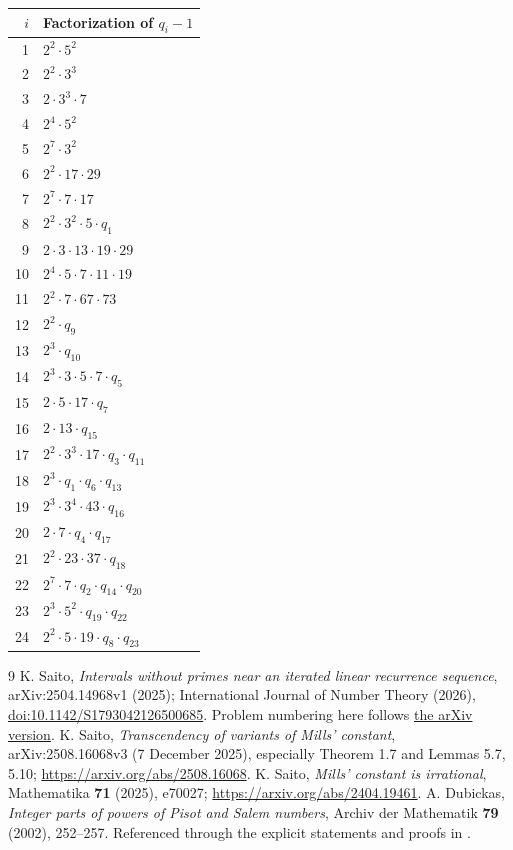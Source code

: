 \documentclass[11pt,a4paper]{article}
\theoremstyle{definition}\newtheorem{definition}[theorem]{Definition}
\theoremstyle{remark}\newtheorem{remark}[theorem]{Remark}
\begin{document}
\begin{longtable}{r p{.77\linewidth}}
\toprule $i$ & Factorization of $q_i-1$\\\midrule\endhead
1 & $2^{2}\cdot 5^{2}$\\
2 & $2^{2}\cdot 3^{3}$\\
3 & $2\cdot 3^{3}\cdot 7$\\
4 & $2^{4}\cdot 5^{2}$\\
5 & $2^{7}\cdot 3^{2}$\\
6 & $2^{2}\cdot 17\cdot 29$\\
7 & $2^{7}\cdot 7\cdot 17$\\
8 & $2^{2}\cdot 3^{2}\cdot 5\cdot q_{1}$\\
9 & $2\cdot 3\cdot 13\cdot 19\cdot 29$\\
10 & $2^{4}\cdot 5\cdot 7\cdot 11\cdot 19$\\
11 & $2^{2}\cdot 7\cdot 67\cdot 73$\\
12 & $2^{2}\cdot q_{9}$\\
13 & $2^{3}\cdot q_{10}$\\
14 & $2^{3}\cdot 3\cdot 5\cdot 7\cdot q_{5}$\\
15 & $2\cdot 5\cdot 17\cdot q_{7}$\\
16 & $2\cdot 13\cdot q_{15}$\\
17 & $2^{2}\cdot 3^{3}\cdot 17\cdot q_{3}\cdot q_{11}$\\
18 & $2^{3}\cdot q_{1}\cdot q_{6}\cdot q_{13}$\\
19 & $2^{3}\cdot 3^{4}\cdot 43\cdot q_{16}$\\
20 & $2\cdot 7\cdot q_{4}\cdot q_{17}$\\
21 & $2^{2}\cdot 23\cdot 37\cdot q_{18}$\\
22 & $2^{7}\cdot 7\cdot q_{2}\cdot q_{14}\cdot q_{20}$\\
23 & $2^{3}\cdot 5^{2}\cdot q_{19}\cdot q_{22}$\\
24 & $2^{2}\cdot 5\cdot 19\cdot q_{8}\cdot q_{23}$\\
\bottomrule\end{longtable}\endgroup

\begin{thebibliography}{9}
 K. Saito, \emph{Intervals without primes near an iterated linear recurrence sequence}, arXiv:2504.14968v1 (2025); International Journal of Number Theory (2026), \href{https://doi.org/10.1142/S1793042126500685}{doi:10.1142/S1793042126500685}. Problem numbering here follows \href{https://arxiv.org/abs/2504.14968}{the arXiv version}.
 K. Saito, \emph{Transcendency of variants of Mills' constant}, arXiv:2508.16068v3 (7 December 2025), especially Theorem 1.7 and Lemmas 5.7, 5.10; \url{https://arxiv.org/abs/2508.16068}.
 K. Saito, \emph{Mills' constant is irrational}, Mathematika \textbf{71} (2025), e70027; \url{https://arxiv.org/abs/2404.19461}.
 A. Dubickas, \emph{Integer parts of powers of Pisot and Salem numbers}, Archiv der Mathematik \textbf{79} (2002), 252--257. Referenced through the explicit statements and proofs in \cite{saito-variants}.
\end{thebibliography}
\end{document}
